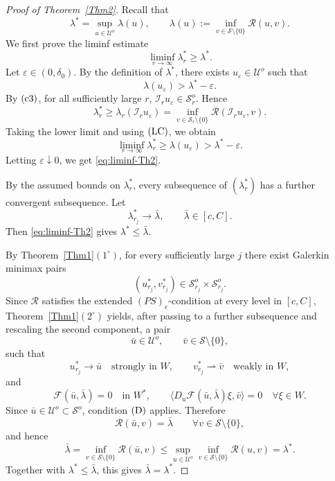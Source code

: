 \documentclass[preprint,10pt]{elsarticle}
\numberwithin{equation}{section}
\begin{document}
\begin{proof}[Proof of Theorem~\ref{Thm2}]
	Recall that
	\[
	\lambda^*
	=
	\sup_{u\in\mathcal U^o}
	\lambda(u),
	\qquad
	\lambda(u):=
	\inf_{v\in\mathcal S\setminus\{0\}}\mathcal R(u,v).
	\]
	We first prove the liminf estimate
	\begin{equation}\label{eq:liminf-Th2}
		\liminf_{r\to\infty}\lambda_r^*\ge \lambda^* .
	\end{equation}
	Let \(\varepsilon\in(0,\delta_0)\). By the definition of \(\lambda^*\),
	there exists \(u_\varepsilon\in\mathcal U^o\) such that
	\[
	\lambda(u_\varepsilon)>\lambda^*-\varepsilon .
	\]
	By \({\rm (c3)}\), for all sufficiently large \(r\),
	\(\mathcal I_ru_\varepsilon\in\mathcal S_r^o\). Hence
	\[
	\lambda_r^*
	\ge
	\lambda_r(\mathcal I_ru_\varepsilon)
	=
	\inf_{v\in\mathcal S_r\setminus\{0\}}
	\mathcal R(\mathcal I_ru_\varepsilon,v).
	\]
	Taking the lower limit and using \({\rm (LC)}\), we obtain
	\[
	\liminf_{r\to\infty}\lambda_r^*
	\ge
	\lambda(u_\varepsilon)
	>
	\lambda^*-\varepsilon .
	\]
	Letting \(\varepsilon\downarrow0\), we get \eqref{eq:liminf-Th2}.
	
	By the assumed bounds on \(\lambda_r^*\), every subsequence of
	\((\lambda_r^*)\) has a further convergent subsequence. Let
	\[
	\lambda_{r_j}^*\to\bar\lambda,
	\qquad
	\bar\lambda\in[c,C].
	\]
	Then \eqref{eq:liminf-Th2} gives \(\lambda^*\le\bar\lambda\).
	
	By Theorem~\ref{Thm1}\((1^\circ)\), for every sufficiently large \(j\)
	there exist Galerkin minimax pairs
	\[
	(u_{r_j}^*,v_{r_j}^*)
	\in
	\mathcal S_{r_j}^o\times\mathcal S_{r_j}^o .
	\]
	Since \(\mathcal R\) satisfies the extended \((PS)_e\)-condition at every
	level in \([c,C]\), Theorem~\ref{Thm1}\((2^\circ)\) yields, after passing
	to a further subsequence and rescaling the second component, a pair
	\[
	\bar u\in\mathcal U^o,
	\qquad
	\bar v\in\mathcal S\setminus\{0\},
	\]
	such that
	\[
	u_{r_j}^*\to\bar u \quad\text{strongly in }W,
	\qquad
	v_{r_j}^*\rightharpoonup\bar v \quad\text{weakly in }W,
	\]
	and
	\[
	\mathcal F(\bar u,\bar\lambda)=0
	\quad\text{in }W^*,
	\qquad
	\bigl\langle
	D_u\mathcal F(\bar u,\bar\lambda)\xi,\bar v
	\bigr\rangle=0
	\quad \forall \xi\in W .
	\]
	Since \(\bar u\in\mathcal U^o\subset\mathcal S^o\), condition
	\({\rm (D)}\) applies. Therefore
	\[
	\mathcal R(\bar u,v)=\bar\lambda
	\qquad
	\forall v\in\mathcal S\setminus\{0\},
	\]
	and hence
	\[
	\bar\lambda
	=
	\inf_{v\in\mathcal S\setminus\{0\}}\mathcal R(\bar u,v)
	\le
	\sup_{u\in\mathcal U^o}
	\inf_{v\in\mathcal S\setminus\{0\}}\mathcal R(u,v)
	=
	\lambda^* .
	\]
	Together with \(\lambda^*\le\bar\lambda\), this gives
	\(\bar\lambda=\lambda^*\).
	

\end{proof}
\end{document}
